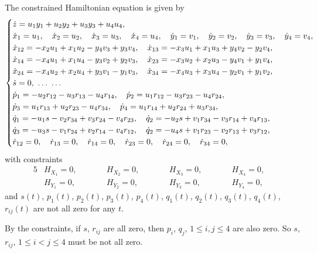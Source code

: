 \documentclass[11pt]{article}
\numberwithin{equation}{section}
\numberwithin{equation}{section}
\theoremstyle{definition}
\newcommand{\0}{\boldsymbol{0}}
\begin{document}
The constrained Hamiltonian equation is given by
\begin{gather}
\begin{cases}
\dot{z} = u_1y_1 + u_2y_2 + u_3y_3 + u_4u_4,
\\
\dot{x}_1 = u_1, \quad \dot{x}_2 = u_2, \quad \dot{x}_3 = u_3, \quad \dot{x}_4 = u_4, \quad
\dot{y}_1 = v_1, \quad \dot{y}_2 = v_2, \quad \dot{y}_3 = v_3, \quad \dot{y}_4 = v_4,
\\
\dot{x}_{12} = - x_2u_1 + x_1u_2 - y_4v_3 + y_3v_4, \quad
\dot{x}_{13} = - x_3u_1 + x_1u_3 + y_4v_2 - y_2v_4,
\\
\dot{x}_{14} = - x_4u_1 + x_1u_4 - y_3v_2 + y_2v_3, \quad
\dot{x}_{23} = - x_3u_2 + x_2u_3 - y_4v_1 + y_1v_4,
\\
\dot{x}_{24} = - x_4u_2 + x_2u_4 + y_3v_1 - y_1v_3, \quad
\dot{x}_{34} = - x_4u_3 + x_3u_4 - y_2v_1 + y_1v_2,
\\
\dot{s} = 0, \ \dots \ \dots
\\
\dot{p}_1 = - u_2r_{12} - u_3r_{13} - u_4r_{14}, \quad \dot{p}_2 = u_1r_{12} - u_3r_{23} - u_4r_{24},
\\
\dot{p}_3 = u_1r_{13} + u_2r_{23} - u_4r_{34}, \quad \dot{p}_4 = u_1r_{14} + u_2r_{24} + u_3r_{34},
\\
\dot{q}_1 = - u_1s - v_2r_{34} + v_3r_{24} - v_4r_{23}, \quad \dot{q}_2 = - u_2s + v_1r_{34} - v_3r_{14} + v_4r_{13},
\\
\dot{q}_3 = - u_3s - v_1r_{24} + v_2r_{14} - v_4r_{12}, \quad \dot{q}_2 = - u_4s + v_1r_{23} - v_2r_{13} + v_3r_{12},
\\
\dot{r}_{12} = 0, \quad \dot{r}_{13} = 0, \quad \dot{r}_{14} = 0, \quad \dot{r}_{23} = 0, \quad \dot{r}_{24} = 0, \quad \dot{r}_{34} = 0,
\end{cases}\hspace{-10mm}
 \label{sharp}
\end{gather}
with constraints
\begin{alignat*}{5}
&H_{X_1} = 0, \qquad&& H_{X_2} = 0, \qquad&& H_{X_3} = 0, \qquad&& H_{X_4} = 0,& \\
&H_{Y_1} = 0, \qquad&& H_{Y_2} = 0, \qquad&& H_{Y_3} = 0, \qquad&& H_{Y_4} = 0,&
\end{alignat*}
and $s(t)$, $p_1(t)$, $p_2(t)$, $p_3(t)$, $p_4(t)$, $q_1(t)$, $q_2(t)$, $q_3(t)$, $q_4(t)$, $r_{ij}(t)$ are not all zero for any $t$.

By the constraints, if $s$, $r_{ij}$ are all zero, then $p_i$, $q_j$, $1 \leq i, j \leq 4$ are also zero.
So $s$, $r_{ij}$, $1 \leq i < j \leq 4$ must be not all zero.
\end{document}
